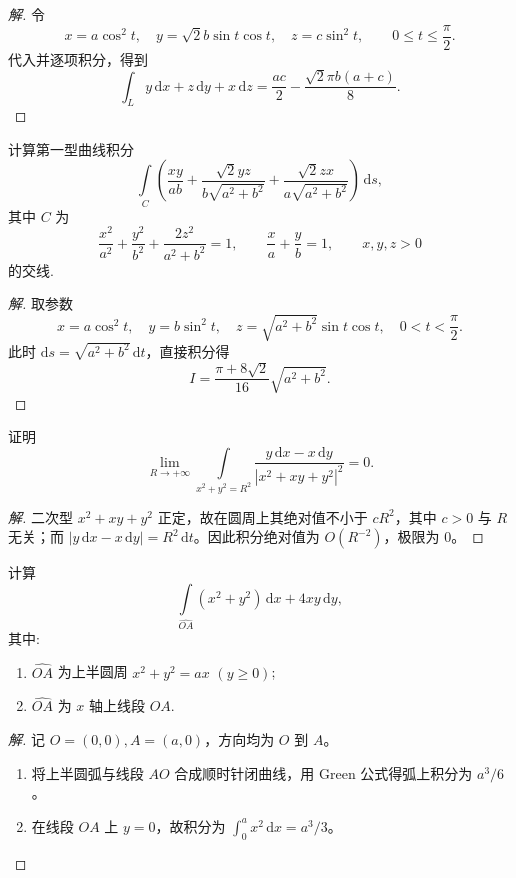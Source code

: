 \documentclass[../../数学分析培优讲义(答案版).tex]{subfiles}
\begin{document}
\begin{proof}[解]
令
\[
x=a\cos^2t,\quad y=\sqrt{2}b\sin t\cos t,\quad z=c\sin^2t,\qquad 0\leq t\leq\dfrac{\pi}{2}.
\]
代入并逐项积分，得到
\[
\int_Ly\,\mathrm{d}x+z\,\mathrm{d}y+x\,\mathrm{d}z
=\dfrac{ac}{2}-\dfrac{\sqrt{2}\pi b(a+c)}{8}.
\]
\end{proof}

\begin{example}
计算第一型曲线积分
\[
    \int\limits_C\left(
    \dfrac{xy}{ab}+\dfrac{\sqrt{2}yz}{b\sqrt{a^2+b^2}}+
    \dfrac{\sqrt{2}zx}{a\sqrt{a^2+b^2}}
    \right)\,\mathrm{d}s,
\]
其中 $C$ 为
\[
    \dfrac{x^2}{a^2}+\dfrac{y^2}{b^2}+\dfrac{2z^2}{a^2+b^2}=1,
    \qquad \dfrac{x}{a}+\dfrac{y}{b}=1,
    \qquad x,y,z>0
\]
的交线.
\end{example}

\begin{proof}[解]
取参数
\[
x=a\cos^2t,\quad y=b\sin^2t,\quad z=\sqrt{a^2+b^2}\sin t\cos t,\quad 0<t<\dfrac{\pi}{2}.
\]
此时 $\mathrm{d}s=\sqrt{a^2+b^2}\,\mathrm{d}t$，直接积分得
\[
I=\dfrac{\pi+8\sqrt{2}}{16}\sqrt{a^2+b^2}.
\]
\end{proof}

\begin{example}
证明
\[
    \lim\limits_{R\to+\infty}
    \int\limits_{x^2+y^2=R^2}
    \dfrac{y\,\mathrm{d}x-x\,\mathrm{d}y}{|x^2+xy+y^2|^2}=0.
\]
\end{example}

\begin{proof}[解]
二次型 $x^2+xy+y^2$ 正定，故在圆周上其绝对值不小于 $cR^2$，其中 $c>0$ 与 $R$ 无关；而 $|y\,\mathrm{d}x-x\,\mathrm{d}y|=R^2\,\mathrm{d}t$。因此积分绝对值为 $O(R^{-2})$，极限为 $0$。
\end{proof}

\begin{example}
计算
\[
    \int\limits_{\widehat{OA}}(x^2+y^2)\,\mathrm{d}x+4xy\,\mathrm{d}y,
\]
其中:
\begin{enumerate}[label=(\arabic*)]
    \item $\widehat{OA}$ 为上半圆周 $x^2+y^2=ax$ $(y\geq0)$;
    \item $\widehat{OA}$ 为 $x$ 轴上线段 $OA$.
\end{enumerate}
\end{example}

\begin{proof}[解]
记 $O=(0,0),A=(a,0)$，方向均为 $O$ 到 $A$。
\begin{enumerate}[label=(\arabic*)]
\item 将上半圆弧与线段 $AO$ 合成顺时针闭曲线，用 Green 公式得弧上积分为 $a^3/6$。
\item 在线段 $OA$ 上 $y=0$，故积分为 $\int_0^ax^2\,\mathrm{d}x=a^3/3$。
\end{enumerate}
\end{proof}
\end{document}
